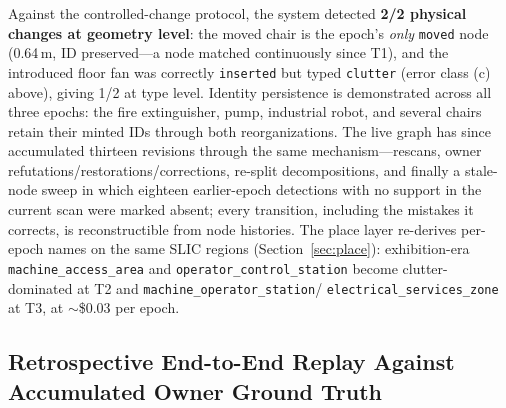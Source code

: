 \documentclass[electronics,article,accept,pdftex,moreauthors]{Definitions/mdpi}
\begin{document}
Against the controlled-change protocol, the system detected \textbf{{2/2
physical changes at geometry level}}: the moved chair is the epoch's
\emph{only} \texttt{moved} node (0.64\,m, ID preserved---a node matched
continuously since T1), and the introduced floor fan was correctly
\texttt{inserted} but typed \texttt{clutter} (error class (c) above), giving
1/2 at type level. Identity persistence is demonstrated across all three
epochs: the fire extinguisher, pump, industrial robot, and several chairs
retain their minted IDs through both reorganizations. The live graph has
since accumulated thirteen revisions through the same mechanism---rescans, owner refutations/restorations/corrections, re-split
decompositions, and finally a stale-node sweep in which eighteen
earlier-epoch detections with no support in the current scan were marked
absent; every transition, including the mistakes it corrects, is
reconstructible from node histories. The place layer
re-derives per-epoch names on the same SLIC regions
(\mbox{Section~\ref{sec:place}}): exhibition-era \texttt{machine\_access\_area} and
\texttt{operator\_control\_station} become clutter-dominated at T2 and
\texttt{machine\_operator\_station}/\allowbreak
\texttt{electrical\_services\_zone} at T3, at $\sim$\$0.03 per epoch.





\subsection{Retrospective End-to-End Replay Against Accumulated Owner
Ground Truth}
\label{sec:exp-endtoend}
\end{document}
